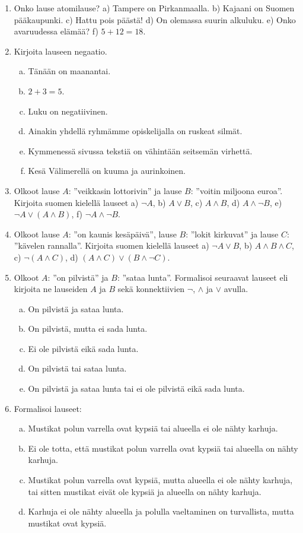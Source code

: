 \Harjoitustehtavat

\begin{enumerate}
\item Onko lause atomilause?
a) Tampere on Pirkanmaalla. b) Kajaani on Suomen pääkaupunki. c) Hattu pois päästä! d) On olemassa suurin alkuluku.
e) Onko avaruudessa elämää? f) $5 + 12 = 18$.

\item Kirjoita lauseen negaatio.
\begin{enumerate}[a)]
\item Tänään on maanantai.
\item $2+3=5$.
\item Luku on negatiivinen.
\item Ainakin yhdellä ryhmämme opiskelijalla on ruskeat silmät.
\item Kymmenessä sivussa tekstiä on vähintään seitsemän virhettä.
\item Kesä Välimerellä on kuuma ja aurinkoinen.
\end{enumerate}

\item Olkoot lause $A$: ''veikkasin lottorivin'' ja lause $B$: ''voitin miljoona euroa''. Kirjoita suomen kielellä lauseet
a) $\lnot A$, b) $A\lor B$, c) $A\land B$, d) $A\land \lnot B$,  
e) $\lnot A\lor (A\land B)$, f) $\lnot A\land \lnot B$.

\item
Olkoot lause $A$: ''on kaunis kesäpäivä'',  lause $B$: ''lokit kirkuvat'' ja lause $C$: ''kävelen rannalla''. Kirjoita suomen kielellä lauseet
a) $\lnot A\lor B$,
b) $A\land B \land C$, c)
$\lnot(A\land C)$,
d) $(A\land C)\lor (B\land
\lnot C)$.

\item Olkoot $A$: ''on pilvistä'' ja $B$: ''sataa
lunta''. Formalisoi seuraavat lauseet eli kirjoita ne
lauseiden $A$ ja $B$ sekä konnektiivien $\lnot$, $\land$
ja $\lor$ avulla.
\begin{enumerate}[a)]
\item On pilvistä ja sataa lunta.
\item On pilvistä, mutta ei sada lunta.
\item Ei ole pilvistä eikä sada lunta.
\item On pilvistä tai sataa lunta.
\item On pilvistä ja sataa lunta tai ei ole pilvistä
eikä sada lunta.
\end{enumerate}

\item Formalisoi lauseet:
\begin{enumerate}[a)]
\item Mustikat polun varrella ovat kypsiä tai
alueella ei ole nähty karhuja.
\item Ei ole totta, että mustikat polun varrella ovat
kypsiä tai alueella on nähty karhuja.
\item Mustikat polun varrella ovat kypsiä, mutta
alueella ei ole nähty karhuja, tai sitten mustikat eivät
ole kypsiä ja alueella on nähty karhuja.
\item Karhuja ei ole nähty alueella ja polulla
vaeltaminen on turvallista, mutta mustikat ovat kypsiä.
\end{enumerate}


\end{enumerate}
